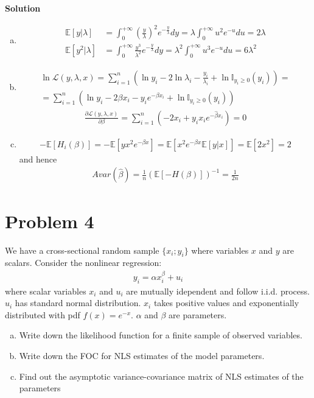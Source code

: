 \documentclass[a4paper]{article}
\newcommand{\expect}{\mathbb{E}}
\newcommand{\summa}{\sum_{i=1}^n}
\begin{document}
\textbf{Solution}



\begin{enumerate}[(a)]
	\item 
	\begin{align*}
	\expect[y|\lambda] &= \int_{0}^{+\infty} \left(\frac{y}{\lambda}\right)^2e^{-\frac{y}{\lambda}}dy = \lambda \int_{0}^{+\infty} u^2e^{-u}du = 2 \lambda\\
	\expect[y^2|\lambda] &= \int_{0}^{+\infty} \frac{y^3}{\lambda^2}e^{-\frac{y}{\lambda}}dy = \lambda^2 \int_{0}^{+\infty} u^3e^{-u}du = 6 \lambda^2
	\end{align*}
	\item 
	\begin{align*}
	\ln \mathcal{L}(y, \lambda, x) = \summa \left( \ln y_i - 2 \ln \lambda_i - \frac{y_i}{\lambda_i} + \ln \mathbb{I}_{y_i \ge 0}(y_i)\right) = \\ =\summa \left( \ln y_i - 2 \beta x_i - y_ie^{-\beta x_i} + \ln \mathbb{I}_{y_i \ge 0}(y_i)\right)
	\end{align*}
	\begin{align*}
	\frac{\partial \mathcal{L}(y, \lambda, x)}{\partial \beta} = \summa(-2x_i + y_ix_ie^{-\hat{\beta} x_i}) = 0
	\end{align*}
	\item 
	\begin{align*}
	-\expect[H_i(\beta)] = - \expect[yx^2e^{-\beta x}] = \expect[x^2e^{-\beta x}\expect[y|x]] = \expect[2x^2] = 2
	\end{align*}
	and hence
	\begin{align*}
	Avar(\hat{\beta}) = \frac{1}{n} \left(\expect[-H(\beta)]\right)^{-1} = \frac{1}{2n}
	\end{align*}
\end{enumerate}


\section*{Problem 4}
 We have a cross-sectional random sample $\{x_i; y_i\}$ where variables $x$ and $y$ are
scalars. Consider the nonlinear regression:
\begin{align*}
y_i = \alpha x_i^{\beta} + u_i
\end{align*}
where scalar variables $x_i$ and $u_i$ are mutually idependent and follow i.i.d. process. $u_i$ has standard
normal distribution. $x_i$ takes positive values and exponentially distributed with pdf $f(x) = e^{-x}$.
$\alpha$ and $\beta$ are parameters.
\begin{enumerate}[(a)]
\item Write down the likelihood function for a finite sample of observed variables.
\item Write down the FOC for NLS estimates of the model parameters.
\item Find out the asymptotic variance-covariance matrix of NLS estimates of the parameters
\end{enumerate}
\end{document}
